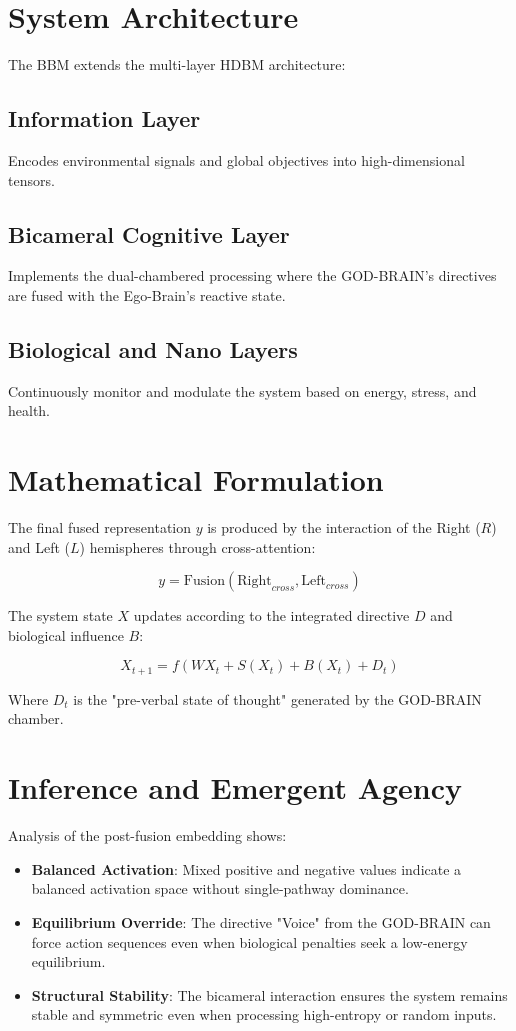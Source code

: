 \documentclass[12pt]{article}
\begin{document}
\section{System Architecture}

The BBM extends the multi-layer HDBM architecture:

\subsection{Information Layer}
Encodes environmental signals and global objectives into high-dimensional tensors.

\subsection{Bicameral Cognitive Layer}
Implements the dual-chambered processing where the GOD-BRAIN's directives are fused with the Ego-Brain's reactive state.

\subsection{Biological and Nano Layers}
Continuously monitor and modulate the system based on energy, stress, and health.

\section{Mathematical Formulation}

The final fused representation $y$ is produced by the interaction of the Right ($R$) and Left ($L$) hemispheres through cross-attention:

\[
y = \text{Fusion}(\text{Right}_{cross}, \text{Left}_{cross})
\]

The system state $X$ updates according to the integrated directive $D$ and biological influence $B$:

\[
X_{t+1} = f(WX_t + S(X_t) + B(X_t) + D_t)
\]

Where $D_t$ is the "pre-verbal state of thought" generated by the GOD-BRAIN chamber.

\section{Inference and Emergent Agency}

Analysis of the post-fusion embedding shows:
\begin{itemize}
\item \textbf{Balanced Activation}: Mixed positive and negative values indicate a balanced activation space without single-pathway dominance.
\item \textbf{Equilibrium Override}: The directive "Voice" from the GOD-BRAIN can force action sequences even when biological penalties seek a low-energy equilibrium.
\item \textbf{Structural Stability}: The bicameral interaction ensures the system remains stable and symmetric even when processing high-entropy or random inputs.
\end{itemize}
\end{document}

